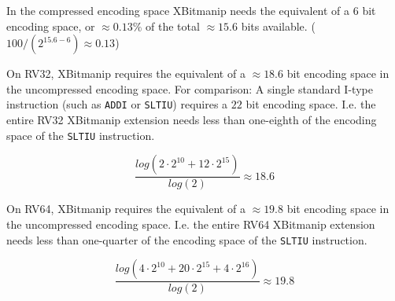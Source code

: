 In the compressed encoding space XBitmanip needs the equivalent of a 6 bit encoding space,
or $\approx 0.13\%$ of the total $\approx 15.6$ bits available. ($ 100 / (2^{15.6-6}) \approx 0.13 $)

On RV32, XBitmanip requires the equivalent of a $\approx 18.6$ bit encoding space in
the uncompressed encoding space. For comparison: A single standard I-type
instruction (such as \texttt{ADDI} or \texttt{SLTIU}) requires a $22$ bit
encoding space. I.e. the entire RV32 XBitmanip extension needs less than
one-eighth of the encoding space of the \texttt{SLTIU} instruction.

$$ \frac{log(2\cdot2^{10} + 12\cdot2^{15})}{log(2)} \approx 18.6 $$

On RV64, XBitmanip requires the equivalent of a $\approx 19.8$ bit encoding
space in the uncompressed encoding space. I.e. the entire RV64 XBitmanip
extension needs less than one-quarter of the encoding space of the
\texttt{SLTIU} instruction.

$$ \frac{log(4\cdot2^{10} + 20\cdot2^{15} + 4\cdot2^{16})}{log(2)} \approx 19.8 $$

